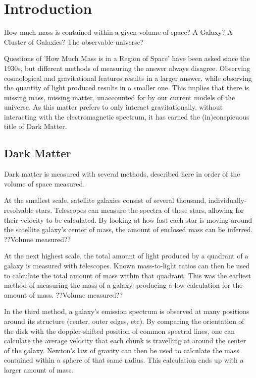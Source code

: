 \cleartooddpage[\thispagestyle{empty}]
\chapter{Introduction}

How much mass is contained within a given volume of space?
A Galaxy?
A Cluster of Galaxies?
The observable universe?

Questions of 'How Much Mass is in a Region of Space' have been asked since the 1930s, but different methods of measuring the answer always disagree.
Observing cosmological and gravitational features results in a larger answer, while observing the quantity of light produced results in a smaller one.
This implies that there is missing mass, missing matter, unaccounted for by our current models of the universe.
As this matter prefers to only interact gravitationally, without interacting with the electromagnetic spectrum, it has earned the (in)conspicuous title of Dark Matter.


\section{Dark Matter}

Dark matter is measured with several methods, described here in order of the volume of space measured.

At the smallest scale, satellite galaxies consist of several thousand, individually-resolvable stars.
Telescopes can measure the spectra of these stars, allowing for their velocity to be calculated.
By looking at how fast each star is moving around the satellite galaxy's center of mass, the amount of enclosed mass can be inferred.
??Volume measured??

At the next highest scale, the total amount of light produced by a quadrant of a galaxy is measured with telescopes.
Known mass-to-light ratios can then be used to calculate the total amount of mass within that quadrant.
This was the earliest method of measuring the mass of a galaxy, producing a low calculation for the amount of mass.
??Volume measured??

In the third method, a galaxy's emission spectrum is observed at many positions around its structure (center, outer edges, etc).
By comparing the orientation of the disk with the doppler-shifted position of common spectral lines, one can calculate the average velocity that each chunk is travelling at around the center of the galaxy.
Newton's law of gravity can then be used to calculate the mass contained within a sphere of that same radius.
This calculation ends up with a larger amount of mass.


